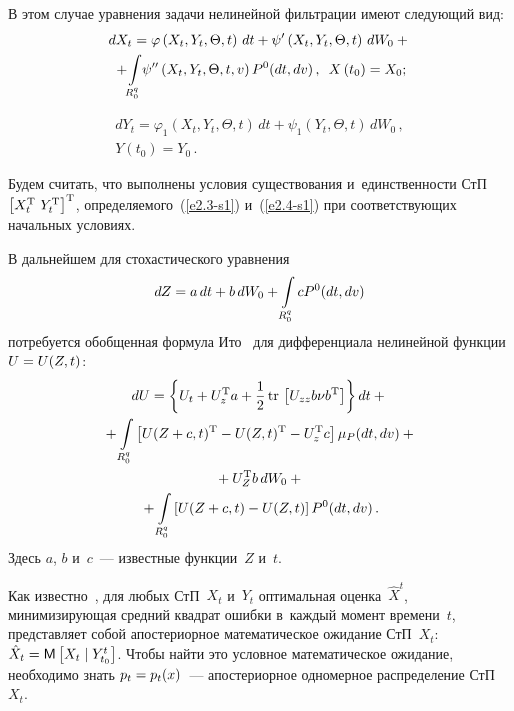 \begin{multicols}{2}
В этом случае уравнения задачи нелинейной фильтрации имеют следующий вид:
\begin{multline}
    dX_t =\varphi \left(X_t, Y_t,\Theta, t\right)\,dt+\psi'
    \left(X_t, Y_t,\Theta, t\right)\,dW_0+{}\\
\!\!{}+\!\int\limits_{R_0^q}\! \psi''\left(X_t, Y_t,\Theta, t,v\right) P^0 (dt, dv)\,,\enskip 
X\left(t_0\right) = X_0;\!\!\label{e2.3-s1}
\end{multline}


\vspace*{-12pt}

\noindent
\begin{multline}
dY_t =\varphi_1 \left(X_t, Y_t,\Theta, t\right)\,dt +
\psi_1 \left(Y_t,\Theta, t\right)\, dW_0\,,\\ Y\left(t_0\right) = Y_0\,.
\label{e2.4-s1}
\end{multline}


Будем считать, что выполнены условия существования и~единственности СтП  
$\lk X_t^{\mathrm{T}}\ Y_t^{\mathrm{T}}\rk^{\mathrm{T}}$, определяемого~(\ref{e2.3-s1}) 
и~(\ref{e2.4-s1}) при соответствующих начальных условиях.

В дальнейшем для стохастического уравнения
\begin{equation}
dZ=a \,dt + b\, dW_0 + \int\limits_{R_0^q} c P^0 (dt, dv)\label{e2.5-s1}
\end{equation}
потребуется обобщенная формула Ито~\cite{5-s1} 
для дифференциала нелинейной функции $U\hm=U(Z,t)$:
 \begin{multline}
 dU =\left\{ U_t + U_z^{\mathrm{T}} a + \displaystyle\frac{\displaystyle 1\mathstrut}{\displaystyle 2\mathstrut}\,\mathrm{tr}\, \left[ U_{zz} b\nu b^{\mathrm{T}}\right]\right\} dt +{}\\
 {}+ \int\limits_{R_0^q} \left[ U(Z+c,t)^{\mathrm{T}} - U(Z,t)^{\mathrm{T}} - U_z^{\mathrm{T}} c\right] 
 \mu_P (dt, dv)+{}\\
   {}+U_Z^{\mathrm{T}} b \,dW_0 +{}\\
   {}+ \int\limits_{R_0^q} \left[ U(Z+c,t) - U(Z,t) \right] P^0 (dt, dv)\,.
   \label{e2.6-s1}
   \end{multline}
Здесь $a$, $b$ и~$c$~--- известные функции~$Z$ и~$t$.

Как известно~\cite{4-s1, 5-s1}, для любых СтП~$X_t$ и~$Y_t$ оптимальная 
оценка~$\hat X^t$, минимизирующая средний квадрат ошибки в~каждый момент времени~$t$, 
представляет собой апостериорное математическое ожидание СтП~$X_t$: 
$\hat X_t \hm= \mm \lk X_t \mid Y_{t_0}^t\rk$. Чтобы найти это условное 
математическое ожидание, необходимо знать $p_t \hm= p_t (x)$~--- 
апостериорное одномерное распределение СтП~$X_t$.


\end{multicols}

